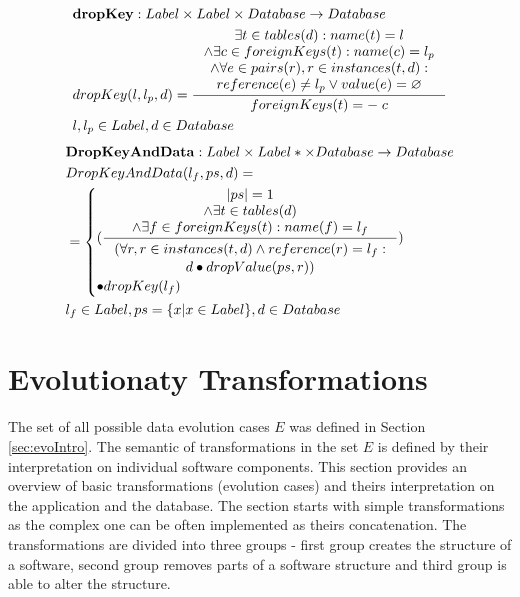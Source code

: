 \documentclass[11pt]{article}
\begin{document}
\begin{align*}
&	\mathbf{dropKey} : Label \times Label \times Database \rightarrow Database \\
&	dropKey(l, l_p, d) = \inference{ \exists t \in tables(d) : name(t) = l \\ \wedge \exists c \in foreignKeys(t) : name(c) = l_p \\ \wedge \forall e \in  pairs(r), r \in instances(t, d) : \\ reference(e) \neq l_p \vee value(e) = \varnothing  }{foreignKeys(t) =- \; c}\\
&	 l, l_p \in Label, d \in Database 
\end{align*}
\begin{align*}
&	\mathbf{DropKeyAndData} : Label \times Label* \times Database \rightarrow Database \\
&	DropKeyAndData(l_f, ps, d) = \\
& = \begin{cases}
 	(\inference{|ps| = 1 \\ \wedge \exists t \in tables(d) \\ \wedge \exists f \in foreignKeys(t) : name(f) = l_f}{\begin{gathered}
	 	(\forall r, r \in instances(t,d) \wedge reference(r) = l_f: \\d \bullet dropValue(ps, r)) \end{gathered}}) \\ \bullet dropKey(l_f)  
 \end{cases}
	\\
&	l_f \in Label, ps = \{x | x \in Label \}, d \in Database
\end{align*}



\section{Evolutionaty Transformations}
\label{sec:Evolutionaty-Transformations}
The set of all possible data evolution cases $E$ was defined in Section \ref{sec:evoIntro}. The semantic of transformations in the set $E$ is defined by their interpretation on individual software components. This section provides an overview of basic transformations (evolution cases) and theirs interpretation on the application and the database. The section starts with simple transformations as the complex one can be often implemented as theirs concatenation. The transformations are divided into three groups - first group creates the structure of a software, second group removes parts of a software structure and third group is able to alter the structure.
\end{document}
